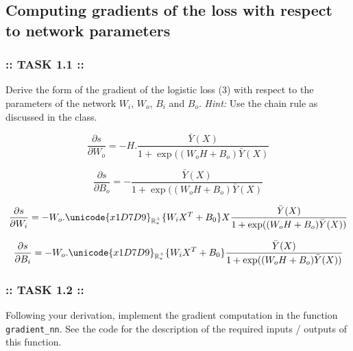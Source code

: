\documentclass[11pt]{article}
\begin{document}
    \hypertarget{computing-gradients-of-the-loss-with-respect-to-network-parameters}{%
\subsection{Computing gradients of the loss with respect to network
parameters}\label{computing-gradients-of-the-loss-with-respect-to-network-parameters}}

    \hypertarget{task-1.1}{%
\subsubsection{:: TASK 1.1 ::}\label{task-1.1}}

Derive the form of the gradient of the logistic loss (3) with respect to
the parameters of the network \(W_i\), \(W_o\), \(B_i\) and \(B_o\).
\emph{Hint:} Use the chain rule as discussed in the class.

    \[\frac{\partial s}{\partial W_o} = -H.\frac{\bar{Y}(X)}{1+ \exp((W_oH+B_o)\bar{Y}(X)}\]

\[\frac{\partial s}{\partial B_o} = -\frac{\bar{Y}(X)}{1+ \exp((W_oH+B_o)\bar{Y}(X)}\]

\[\frac{\partial s}{\partial W_i} = -W_o.\unicode{x1D7D9}_{\mathbb{R}^{+}_{*}}\{W_iX^T+B_0\} X \frac{\bar{Y}(X)}{1+ \exp ((W_oH+B_o)\bar{Y}(X))}\]

\[\frac{\partial s}{\partial B_i} = -W_o.\unicode{x1D7D9}_{\mathbb{R}^{+}_{*}}\{W_iX^T+B_0\} \frac{\bar{Y}(X)}{1+ \exp((W_oH+B_o)\bar{Y}(X))}\]

    \hypertarget{task-1.2}{%
\subsubsection{:: TASK 1.2 ::}\label{task-1.2}}

Following your derivation, implement the gradient computation in the
function \texttt{gradient\_nn}. See the code for the description of the
required inputs / outputs of this function.
\end{document}
